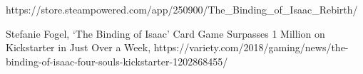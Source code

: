 \documentclass[12pt,twoside]{article}
\begin{document}
\begin{thebibliography}{4}
 https://store.steampowered.com/app/250900/The\_Binding\_of\_Isaac\_Rebirth/

 Stefanie Fogel, ‘The Binding of Isaac’ Card Game Surpasses 1 Million on Kickstarter in Just Over a Week, https://variety.com/2018/gaming/news/the-binding-of-isaac-four-souls-kickstarter-1202868455/



\end{thebibliography}

\clearpage

\makesummary
\end{document}
